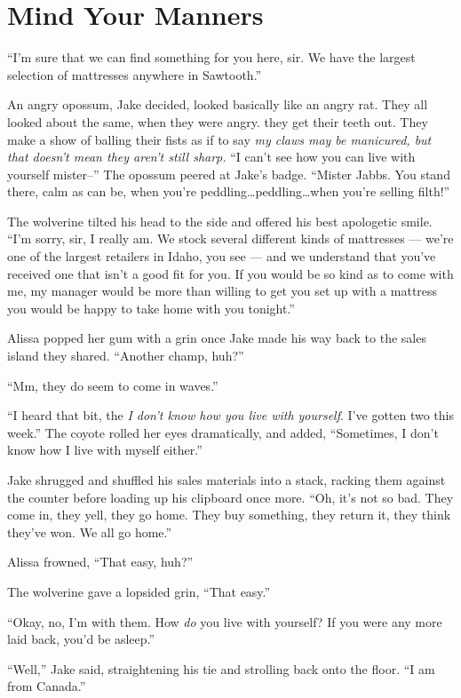 \hypertarget{mind-your-manners}{%
\chapter{Mind Your Manners}\label{mind-your-manners}}

``I'm sure that we can find something for you here, sir. We have the largest selection of mattresses anywhere in Sawtooth.''

An angry opossum, Jake decided, looked basically like an angry rat. They all looked about the same, when they were angry. they get their teeth out. They make a show of balling their fists as if to say \emph{my claws may be manicured, but that doesn't mean they aren't still sharp.} ``I can't see how you can live with yourself mister--'' The opossum peered at Jake's badge. ``Mister Jabbs. You stand there, calm as can be, when you're peddling\ldots{}peddling\ldots{}when you're selling filth!''

The wolverine tilted his head to the side and offered his best apologetic smile. ``I'm sorry, sir, I really am. We stock several different kinds of mattresses --- we're one of the largest retailers in Idaho, you see --- and we understand that you've received one that isn't a good fit for you. If you would be so kind as to come with me, my manager would be more than willing to get you set up with a mattress you would be happy to take home with you tonight.''

Alissa popped her gum with a grin once Jake made his way back to the sales island they shared. ``Another champ, huh?''

``Mm, they do seem to come in waves.''

``I heard that bit, the \emph{I don't know how you live with yourself}. I've gotten two this week.'' The coyote rolled her eyes dramatically, and added, ``Sometimes, I don't know how I live with myself either.''

Jake shrugged and shuffled his sales materials into a stack, racking them against the counter before loading up his clipboard once more. ``Oh, it's not so bad. They come in, they yell, they go home. They buy something, they return it, they think they've won. We all go home.''

Alissa frowned, ``That easy, huh?''

The wolverine gave a lopsided grin, ``That easy.''

``Okay, no, I'm with them. How \emph{do} you live with yourself? If you were any more laid back, you'd be asleep.''

``Well,'' Jake said, straightening his tie and strolling back onto the floor. ``I am from Canada.''
